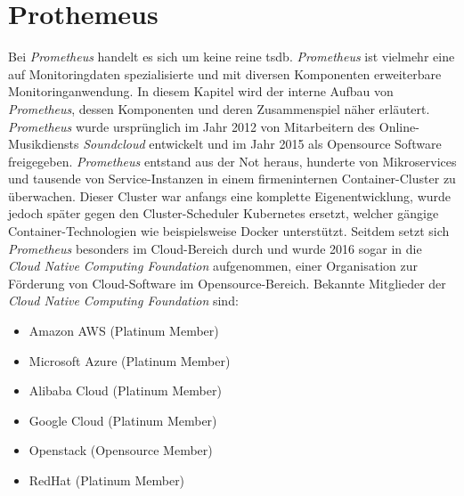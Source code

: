\documentclass[titlepage]{report}
\begin{document}
\section{Prothemeus}
Bei \emph{Prometheus} handelt es sich um keine reine \gls{tsdb}.
\emph{Prometheus} ist vielmehr eine auf Monitoringdaten spezialisierte
und mit diversen Komponenten erweiterbare Monitoringanwendung. In diesem
Kapitel wird der interne Aufbau von \emph{Prometheus}, dessen
Komponenten und deren Zusammenspiel näher erläutert. \emph{Prometheus}
wurde ursprünglich im Jahr 2012 von Mitarbeitern des Online-Musikdiensts
\emph{Soundcloud} entwickelt\cite{PROMETHEUS_OVERVIEW} und im Jahr 2015
als Opensource Software freigegeben. \emph{Prometheus} entstand aus der
Not heraus, hunderte von Mikroservices und tausende von Service\hyp{}Instanzen
in einem firmeninternen Container\hyp{}Cluster zu
überwachen\cite{PROMETHEUS_YOUTUBE}. Dieser Cluster war anfangs eine
komplette Eigenentwicklung\cite{PROMETHEUS_YOUTUBE}, wurde jedoch später gegen den
Cluster\hyp{}Scheduler Kubernetes ersetzt\cite{KUBERNETESSOUNDCLOUD}, welcher gängige
Container\hyp{}Technologien wie beispielsweise Docker
unterstützt\cite{KUBERNETES}. Seitdem setzt sich
\emph{Prometheus} besonders im Cloud\hyp{}Bereich durch und wurde 2016
sogar in die \emph{Cloud Native Computing Foundation}
aufgenommen\cite{CNCF}, einer Organisation zur Förderung von
Cloud\hyp{}Software im Opensource\hyp{}Bereich. Bekannte Mitglieder der
\emph{Cloud Native Computing Foundation} sind\cite{CNCFLANDSCAPE}:
\begin{itemize}
    \item Amazon AWS (Platinum Member)
    \item Microsoft Azure (Platinum Member)
    \item Alibaba Cloud (Platinum Member)
    \item Google Cloud (Platinum Member)
    \item Openstack (Opensource Member)
    \item RedHat (Platinum Member)
\end{itemize}
\end{document}
